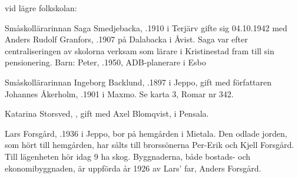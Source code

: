  vid lägre folkskolan:

%
Småskollärarinnan Saga Smedjebacka, .1910 i Terjärv gifte sig 04.10.1942 med Anders Rudolf Granfors, .1907 på Dalabacka i Åvist. Saga var efter centraliseringen av skolorna verksam som lärare i Kristinestad fram till sin pensionering.
Barn: Peter, .1950, ADB-planerare i Esbo


%
Småskollärarinnan Ingeborg Backlund, .1897 i Jeppo, gift med författaren Johannes Åkerholm, .1901 i Maxmo. Se karta 3, Romar nr 342.
\begin{jhchildren}
  \item {}
  \item {}
  \item {}
\end{jhchildren}


%
Katarina Storsved, , gift med Axel Blomqvist,  i Pensala.
\begin{jhchildren}
  \item {}
  \item {}
  \item {}
  \item {}
\end{jhchildren}



%



%
Lars Forsgård, .1936 i Jeppo, bor på hemgården i Mietala. Den odlade jorden, som hört till hemgården, har sålts till brorssönerna Per-Erik och Kjell Forsgård. Till lägenheten hör idag 9 ha skog. Byggnaderna, både bostads- och ekonomibyggnaden, är uppförda år 1926 av Lars' far, Anders Forsgård.


